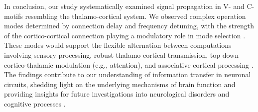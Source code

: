 \documentclass[../main.tex]{subfiles}
\begin{document}
In conclusion, our study systematically examined signal propagation in V- and C-motifs resembling the thalamo-cortical system.
We observed complex operation modes determined by connection delay and frequency detuning, with the strength of the cortico-cortical connection playing a modulatory role in mode selection \citep{pariz_transmission_2021}.
These modes would support the flexible alternation between computations involving sensory processing, robust thalamo-cortical transmission, top-down cortico-thalamic modulation (e.g., attention), and associative cortical processing \citep{pariz_transmission_2021}.
The findings contribute to our understanding of information transfer in neuronal circuits, shedding light on the underlying mechanisms of brain function and providing insights for future investigations into neurological disorders and cognitive processes \citep{fries_rhythms_2015, singer_binding_2007, uhlhaas_neural_2009}.
\end{document}
